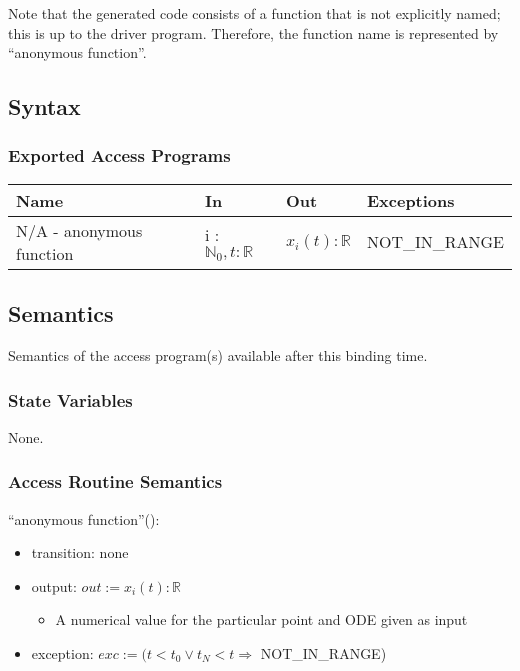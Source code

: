 \documentclass[12pt, titlepage]{article}
\begin{document}
Note that the generated code consists of a function that is not explicitly 
named; this is up to the driver program. Therefore, the function name is 
represented by ``anonymous function''.
\subsection{Syntax}

\subsubsection{Exported Access Programs}

\begin{center}
  \begin{tabular}{p{5cm} p{3cm} p{3cm} p{3cm}}
    \hline
    \textbf{Name} & \textbf{In} & \textbf{Out} & \textbf{Exceptions} \\
    \hline
    N/A - anonymous function & i : $\mathbb{N}_0, t : \mathbb{R}$ & $ x_i(t) : 
    \mathbb{R}$ & NOT\_IN\_RANGE \\
    \hline
  \end{tabular}
\end{center}

\subsection{Semantics}
Semantics of the access program(s) available after this binding time.

\subsubsection{State Variables}
None.

\subsubsection{Access Routine Semantics}

\noindent ``anonymous function''():
\begin{itemize}
  \item transition: none
  \item output: $out := x_{i}(t) : \mathbb{R}$
  \begin{itemize}
    \item A numerical value for the particular point and ODE given as input
  \end{itemize}
  \item exception: $exc := (t < t_0 \lor t_N < t \Rightarrow$ NOT\_IN\_RANGE)
\end{itemize}
\end{document}
